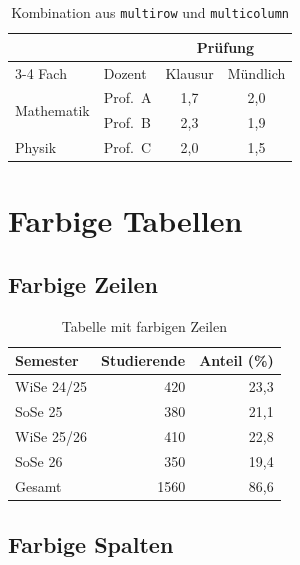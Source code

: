\begin{table}[htbp]
    \centering
    \caption{Kombination aus \texttt{multirow} und \texttt{multicolumn}}
    \label{tab:kombiniert}
    \begin{tabular}{llcc}
        \toprule
        & & \multicolumn{2}{c}{Prüfung} \\
        \cmidrule(lr){3-4}
        Fach & Dozent & Klausur & Mündlich \\
        \midrule
        \multirow{2}{*}{Mathematik}
            & Prof.\ A & 1{,}7 & 2{,}0 \\
            & Prof.\ B & 2{,}3 & 1{,}9 \\
        \midrule
        Physik & Prof.\ C & 2{,}0 & 1{,}5 \\
        \bottomrule
    \end{tabular}
\end{table}

\chapter{Farbige Tabellen}
\label{sec:tab-farbig}

\section{Farbige Zeilen}

\begin{table}[htbp]
    \centering
    \caption{Tabelle mit farbigen Zeilen}
    \label{tab:farbige-zeilen}
    \begin{tabular}{lrr}
        \toprule
        \rowcolor{blue!15}
        Semester & Studierende & Anteil (\%) \\
        \midrule
        WiSe 24/25 & 420 & 23{,}3 \\
        \rowcolor{gray!10}
        SoSe 25 & 380 & 21{,}1 \\
        WiSe 25/26 & 410 & 22{,}8 \\
        \rowcolor{gray!10}
        SoSe 26 & 350 & 19{,}4 \\
        \midrule
        \rowcolor{blue!8}
        Gesamt & 1560 & 86{,}6 \\
        \bottomrule
    \end{tabular}
\end{table}

\section{Farbige Spalten}

